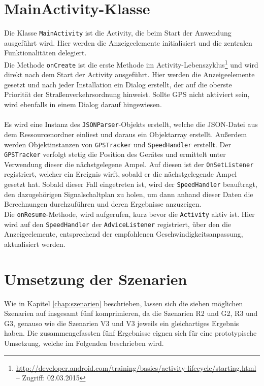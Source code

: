 \section{MainActivity-Klasse}
Die Klasse \texttt{MainActivity} ist die \gls{Activity}, die beim Start der Anwendung ausgeführt wird.  Hier werden die Anzeigeelemente initialisiert und die zentralen Funktionalitäten delegiert.\\
Die Methode \texttt{onCreate} ist die erste Methode im \gls{Activity}-Lebenszyklus\footnote{ \url{http://developer.android.com/training/basics/activity-lifecycle/starting.html} -- Zugriff: 02.03.2015} und wird direkt nach dem Start der \gls{Activity} ausgeführt. Hier werden die Anzeigeelemente gesetzt und nach jeder Installation ein Dialog erstellt, der auf die oberste Priorität der Straßenverkehrsordnung hinweist. Sollte \gls{GPS} nicht aktiviert sein, wird ebenfalls in einem Dialog darauf hingewiesen.\\\\
Es wird eine Instanz des \texttt{JSONParser}-Objekts erstellt, welche die \gls{JSON}-Datei aus dem Ressourcenordner einliest und daraus ein Objektarray erstellt. Außerdem werden Objektinstanzen von \texttt{GPSTracker} und \texttt{SpeedHandler} erstellt. Der \texttt{GPSTracker} verfolgt stetig die Position des Gerätes und ermittelt unter Verwendung dieser die nächstgelegene Ampel. Auf diesen ist der \texttt{OnSetListener} registriert, welcher ein Ereignis wirft, sobald er die nächstgelegende Ampel gesetzt hat. Sobald dieser Fall eingetreten ist, wird der \texttt{SpeedHandler} beauftragt, den dazugehörigen Signalschaltplan zu holen, um dann anhand dieser Daten die Berechnungen durchzuführen und deren Ergebnisse anzuzeigen.\\
Die \texttt{onResume}-Methode, wird aufgerufen, kurz bevor die \texttt{Activity} aktiv ist. Hier wird auf den \texttt{SpeedHandler} der \texttt{AdviceListener} registriert, über den die Anzeigeelemente, entsprechend der empfohlenen Geschwindigkeitsanpassung, aktualisiert werden. 
%
%
\section{Umsetzung der Szenarien}
Wie in Kapitel \ref{chap:szenarien} beschrieben, lassen sich die sieben möglichen Szenarien auf insgesamt fünf komprimieren, da die Szenarien R2 und G2, R3 und G3, genauso wie die Szenarien V3 und V3 jeweils ein gleichartiges Ergebnis haben. Die zusammengefassten fünf Ergebnisse eignen sich für eine prototypische Umsetzung, welche im Folgenden beschrieben wird.
%
%
